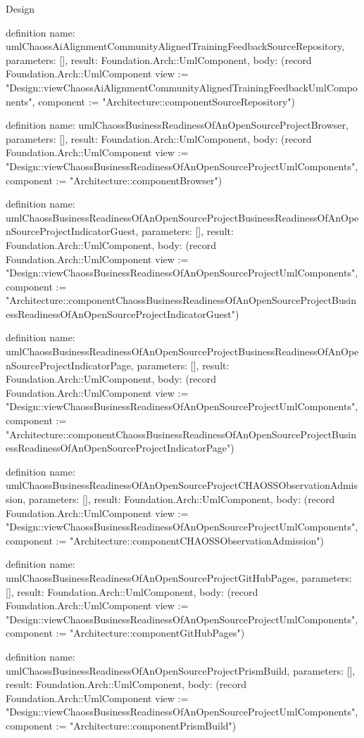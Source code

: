 \begin{lexlean}{Design}
\begin{semanticmodule}
definition{
  name: umlChaossAiAlignmentCommunityAlignedTrainingFeedbackSourceRepository,
  parameters: [],
  result: Foundation.Arch::UmlComponent,
  body: (record Foundation.Arch::UmlComponent {view := "Design::viewChaossAiAlignmentCommunityAlignedTrainingFeedbackUmlComponents", component := "Architecture::componentSourceRepository"})
}

definition{
  name: umlChaossBusinessReadinessOfAnOpenSourceProjectBrowser,
  parameters: [],
  result: Foundation.Arch::UmlComponent,
  body: (record Foundation.Arch::UmlComponent {view := "Design::viewChaossBusinessReadinessOfAnOpenSourceProjectUmlComponents", component := "Architecture::componentBrowser"})
}

definition{
  name: umlChaossBusinessReadinessOfAnOpenSourceProjectBusinessReadinessOfAnOpenSourceProjectIndicatorGuest,
  parameters: [],
  result: Foundation.Arch::UmlComponent,
  body: (record Foundation.Arch::UmlComponent {view := "Design::viewChaossBusinessReadinessOfAnOpenSourceProjectUmlComponents", component := "Architecture::componentChaossBusinessReadinessOfAnOpenSourceProjectBusinessReadinessOfAnOpenSourceProjectIndicatorGuest"})
}

definition{
  name: umlChaossBusinessReadinessOfAnOpenSourceProjectBusinessReadinessOfAnOpenSourceProjectIndicatorPage,
  parameters: [],
  result: Foundation.Arch::UmlComponent,
  body: (record Foundation.Arch::UmlComponent {view := "Design::viewChaossBusinessReadinessOfAnOpenSourceProjectUmlComponents", component := "Architecture::componentChaossBusinessReadinessOfAnOpenSourceProjectBusinessReadinessOfAnOpenSourceProjectIndicatorPage"})
}

definition{
  name: umlChaossBusinessReadinessOfAnOpenSourceProjectCHAOSSObservationAdmission,
  parameters: [],
  result: Foundation.Arch::UmlComponent,
  body: (record Foundation.Arch::UmlComponent {view := "Design::viewChaossBusinessReadinessOfAnOpenSourceProjectUmlComponents", component := "Architecture::componentCHAOSSObservationAdmission"})
}

definition{
  name: umlChaossBusinessReadinessOfAnOpenSourceProjectGitHubPages,
  parameters: [],
  result: Foundation.Arch::UmlComponent,
  body: (record Foundation.Arch::UmlComponent {view := "Design::viewChaossBusinessReadinessOfAnOpenSourceProjectUmlComponents", component := "Architecture::componentGitHubPages"})
}

definition{
  name: umlChaossBusinessReadinessOfAnOpenSourceProjectPrismBuild,
  parameters: [],
  result: Foundation.Arch::UmlComponent,
  body: (record Foundation.Arch::UmlComponent {view := "Design::viewChaossBusinessReadinessOfAnOpenSourceProjectUmlComponents", component := "Architecture::componentPrismBuild"})
}


\end{semanticmodule}
\end{lexlean}
